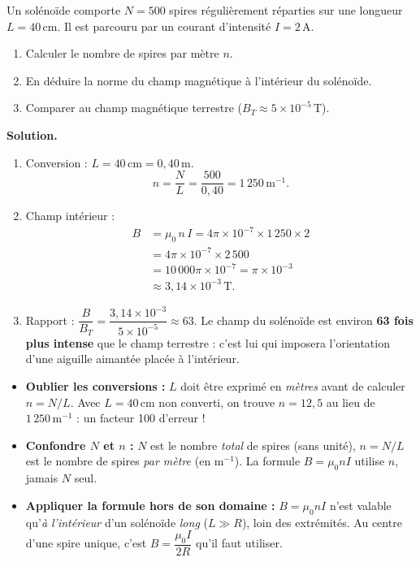 \documentclass[11pt]{article}
\begin{document}
\begin{exoresolu}
Un solénoïde comporte $N = 500$ spires régulièrement réparties sur une longueur $L = 40\,\text{cm}$. Il est parcouru par un courant d'intensité $I = 2\,\text{A}$.
\begin{enumerate}
\item Calculer le nombre de spires par mètre $n$.
\item En déduire la norme du champ magnétique à l'intérieur du solénoïde.
\item Comparer au champ magnétique terrestre ($B_T \approx 5 \times 10^{-5}\,\text{T}$).
\end{enumerate}
\tcblower
\textbf{Solution.}
\begin{enumerate}
\item Conversion : $L = 40\,\text{cm} = 0{,}40\,\text{m}$.
\[ n = \frac{N}{L} = \frac{500}{0{,}40} = 1\,250\,\text{m}^{-1}. \]
\item Champ intérieur :
\begin{align*}
B &= \mu_0\, n\, I = 4\pi \times 10^{-7} \times 1\,250 \times 2 \\
&= 4\pi \times 10^{-7} \times 2\,500 \\
&= 10\,000\pi \times 10^{-7} = \pi \times 10^{-3} \\
&\approx 3{,}14 \times 10^{-3}\,\text{T}.
\end{align*}
\item Rapport : $\dfrac{B}{B_T} = \dfrac{3{,}14 \times 10^{-3}}{5 \times 10^{-5}} \approx 63$. Le champ du solénoïde est environ \textbf{63 fois plus intense} que le champ terrestre : c'est lui qui imposera l'orientation d'une aiguille aimantée placée à l'intérieur.
\end{enumerate}
\end{exoresolu}

\begin{attention}
\begin{itemize}
\item \textbf{Oublier les conversions :} $L$ doit être exprimé en \emph{mètres} avant de calculer $n = N/L$. Avec $L = 40\,\text{cm}$ non converti, on trouve $n = 12{,}5$ au lieu de $1\,250\,\text{m}^{-1}$ : un facteur 100 d'erreur !
\item \textbf{Confondre $N$ et $n$ :} $N$ est le nombre \emph{total} de spires (sans unité), $n = N/L$ est le nombre de spires \emph{par mètre} (en $\text{m}^{-1}$). La formule $B = \mu_0 n I$ utilise $n$, jamais $N$ seul.
\item \textbf{Appliquer la formule hors de son domaine :} $B = \mu_0 n I$ n'est valable qu'\emph{à l'intérieur} d'un solénoïde \emph{long} ($L \gg R$), loin des extrémités. Au centre d'une spire unique, c'est $B = \dfrac{\mu_0 I}{2R}$ qu'il faut utiliser.
\end{itemize}
\end{attention}
\end{document}
